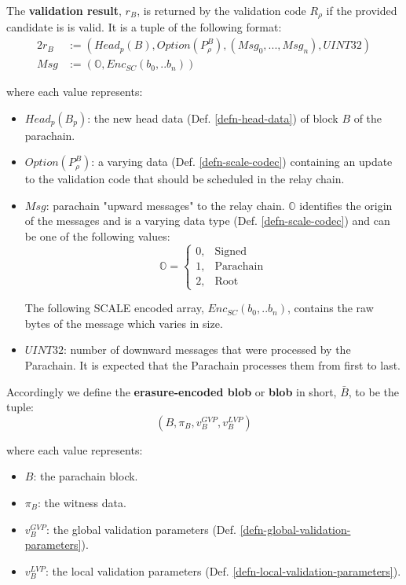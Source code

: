 \begin{definition}
  The \textbf{validation result}, $r_B$, is returned by the validation code $R_{\rho}$
  if the provided candidate is is valid. It is a tuple of the following format:
  \begin{alignat*}{2}
    r_B &:= (Head_p(B), Option(P^B_{\rho}), (Msg_0, ..., Msg_n), UINT32) \\
    Msg &:= (\mathbb{O}, Enc_{SC}(b_0,.. b_n))
  \end{alignat*}

  where each value represents:
  \begin{itemize}
    \item $Head_p(B_p)$: the new head data (Def. \ref{defn-head-data}) of
    block $B$ of the parachain.
    \item $Option(P^B_{\rho})$: a varying data (Def. \ref{defn-scale-codec})
    containing an update to the validation code that should be scheduled in the
    relay chain.
    \item $Msg$: parachain "upward messages" to the relay chain. $\mathbb{O}$
    identifies the origin of the messages and is a varying data type (Def.
    \ref{defn-scale-codec}) and can be one of the following values:
    \begin{equation*}
      \mathbb{O} =
      \begin{cases}
        0, & \text{Signed} \\
        1, & \text{Parachain} \\
        2, & \text{Root}
      \end{cases}
    \end{equation*}

    The following SCALE encoded array, $Enc_{SC}(b_0,.. b_n)$, contains the
    raw bytes of the message which varies in size.
    \item $UINT32$: number of downward messages that were processed by the Parachain. It
    is expected that the Parachain processes them from first to last.
  \end{itemize}
\end{definition}

\begin{definition}
  \label{defn-blob}
  Accordingly we define the {\bf erasure-encoded blob} or {\bf blob} in short,
  {\bf $\bar{B}$}, to be the tuple:
  \[
  (B, \pi_B, v^{GVP}_B, v^{LVP}_B)
  \]

  where each value represents:

  \begin{itemize}
    \item $B$: the parachain block.
    \item $\pi_B$: the witness data.
    \item $v^{GVP}_B$: the global validation parameters (Def. \ref{defn-global-validation-parameters}).
    \item $v^{LVP}_B$: the local validation parameters (Def. \ref{defn-local-validation-parameters}).
  \end{itemize}
\end{definition}

